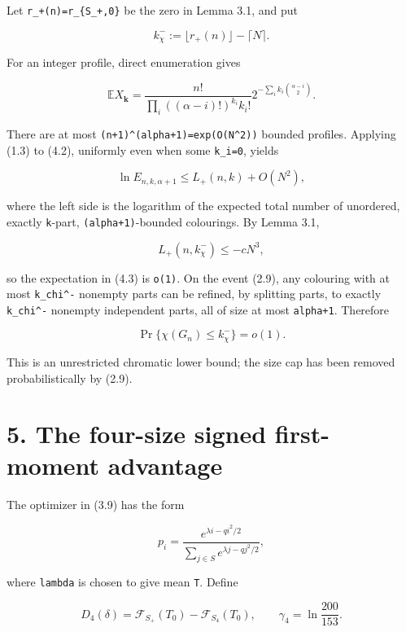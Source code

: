\documentclass[
  11pt,
  a4paper,
]{article}
\begin{document}
Let \texttt{r\_+(n)=r\_\{S\_+,0\}} be the zero in Lemma 3.1, and put

\[
 k_\chi^-:=\lfloor r_+(n)\rfloor-\lceil N\rceil.         \tag{4.1}
\]

For an integer profile, direct enumeration gives

\[
 \mathbb E X_{\mathbf k}
 =\frac{n!}{\prod_i((\alpha-i)!)^{k_i}k_i!}
  2^{-\sum_i k_i\binom{\alpha-i}{2}}.                   \tag{4.2}
\]

There are at most
\texttt{(n+}\allowbreak{}\texttt{1)}\allowbreak{}\texttt{\^{}(alpha+}\allowbreak{}\texttt{1)}\allowbreak{}\texttt{=}\allowbreak{}\texttt{exp(O(N\^{}2)}\allowbreak{}\texttt{)}
bounded profiles. Applying (1.3) to (4.2), uniformly even when some
\texttt{k\_i=0}, yields

\[
 \ln E_{n,k,\alpha+1}\le L_+(n,k)+O(N^2),                \tag{4.3}
\]

where the left side is the logarithm of the expected total number of
unordered, exactly \texttt{k}-part, \texttt{(alpha+1)}-bounded
colourings. By Lemma 3.1,

\[
 L_+(n,k_\chi^-)\le-cN^3,                                \tag{4.4}
\]

so the expectation in (4.3) is \texttt{o(1)}. On the event (2.9), any
colouring with at most \texttt{k\_chi\^{}-} nonempty parts can be
refined, by splitting parts, to exactly \texttt{k\_chi\^{}-} nonempty
independent parts, all of size at most \texttt{alpha+1}. Therefore

\[
 \Pr\{\chi(G_n)\le k_\chi^-\}=o(1).                     \tag{4.5}
\]

This is an unrestricted chromatic lower bound; the size cap has been
removed probabilistically by (2.9).

\section{5. The four-size signed first-moment
advantage}\label{the-four-size-signed-first-moment-advantage}

The optimizer in (3.9) has the form

\[
 p_i=\frac{e^{\lambda i-qi^2/2}}
           {\sum_{j\in S}e^{\lambda j-qj^2/2}},          \tag{5.1}
\]

where \texttt{lambda} is chosen to give mean \texttt{T}. Define

\[
 D_4(\delta)=\mathcal F_{S_+}(T_0)
              -\mathcal F_{S_4}(T_0),\qquad
 \gamma_4=\ln\frac{200}{153}.                            \tag{5.2}
\]
\end{document}
